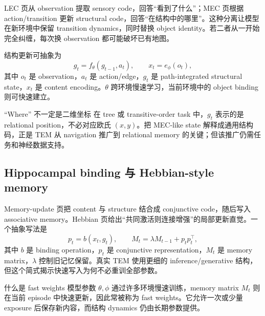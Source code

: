 LEC 页从 observation 提取 sensory code，回答“看到了什么”；MEC 页根据 action/transition 更新 structural code，回答“在结构中的哪里”。这种分离让模型在新环境中保留 transition dynamics，同时替换 object identity。若二者从一开始完全纠缠，每次换 observation 都可能破坏已有地图。



结构更新可抽象为
$$
g_t=f_{\theta}(g_{t-1},a_t),
\qquad
x_t=e_{\phi}(o_t),
$$
其中 $o_t$ 是 observation，$a_t$ 是 action/edge，$g_t$ 是 path-integrated structural state，$x_t$ 是 content encoding。$\theta$ 跨环境慢速学习，当前环境中的 object binding 则可快速建立。

\begin{warningbox}{“Where” 不一定是二维坐标}
在 tree 或 transitive-order task 中，$g_t$ 表示的是 relational position，不必对应欧氏 $(x,y)$。把 MEC-like state 解释成通用结构码，正是 TEM 从 navigation 推广到 relational memory 的关键；但该推广仍需任务和神经数据支持。
\end{warningbox}

\subsection{Hippocampal binding 与 Hebbian-style memory}

Memory-update 页把 content 与 structure 结合成 conjunctive code，随后写入 associative memory。Hebbian 页给出“共同激活则连接增强”的局部更新直觉。一个抽象写法是
$$
p_t=b(x_t,g_t),
\qquad
M_t=\lambda M_{t-1}+p_t p_t^{\top},
$$
其中 $b$ 是 binding operation，$p_t$ 是 conjunctive representation，$M_t$ 是 memory matrix，$\lambda$ 控制旧记忆保留。真实 TEM 使用更细的 inference/generative 结构，但这个简式揭示快速写入为何不必重训全部参数。



\begin{knowledgebox}{什么是 fast weights}
模型参数 $\theta,\phi$ 通过许多环境慢速训练，memory matrix $M_t$ 则在当前 episode 中快速更新，因此常被称为 fast weights。它允许一次或少量 exposure 后保存新内容，而结构 dynamics 仍由长期参数提供。
\end{knowledgebox}

